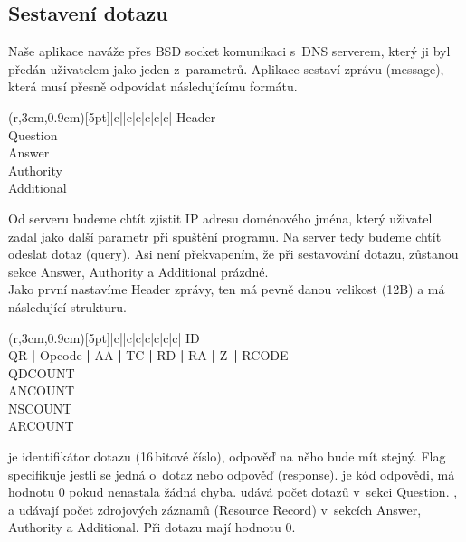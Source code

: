 \documentclass[11pt, a4paper, titlepage]{article}
\begin{document}
	\subsection{Sestavení dotazu}

	Naše aplikace naváže přes BSD socket komunikaci s~DNS serverem, který ji byl předán uživatelem jako jeden z~parametrů. Aplikace sestaví zprávu (message), která musí přesně odpovídat následujícímu formátu.

	\begin{table}[H]
		\centering
		\begin{TAB}(r,3cm,0.9cm)[5pt]{|c|}{|c|c|c|c|c|}
			Header \\
			Question \\
			Answer \\
			Authority \\
			Additional \\
		\end{TAB}
	\end{table}

	Od serveru budeme chtít zjistit IP adresu doménového jména, který uživatel zadal jako další parametr při spuštění programu. Na server tedy budeme chtít odeslat dotaz (query). Asi není překvapením, že při sestavování dotazu, zůstanou sekce Answer, Authority a Additional prázdné. \\

	Jako první nastavíme Header zprávy, ten má pevně danou velikost (12B) a má následující strukturu.

	\begin{table}[H]
		\centering
		\begin{TAB}(r,3cm,0.9cm)[5pt]{|c|}{|c|c|c|c|c|c|}
			ID \\
			QR \textbf{|} Opcode \textbf{|} AA \textbf{|} TC \textbf{|} RD \textbf{|} RA \textbf{|} Z~\textbf{|} RCODE \\
			QDCOUNT \\
			ANCOUNT \\
			NSCOUNT \\
			ARCOUNT \\
		\end{TAB}
	\end{table}

	 je identifikátor dotazu (16\,bitové číslo), odpověď na něho bude mít stejný. Flag  specifikuje jestli se jedná o~dotaz nebo odpověď (response).  je kód odpovědi, má hodnotu 0 pokud nenastala žádná chyba.  udává počet dotazů v~sekci Question. ,  a  udávají počet zdrojových záznamů (Resource Record) v~sekcích Answer, Authority a Additional. Při dotazu mají hodnotu 0. \\
\end{document}
